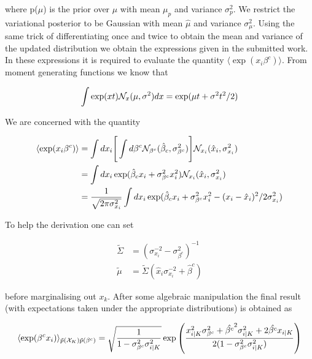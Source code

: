 \documentclass{article}
\begin{document}
\noindent where p($\mu$) is the prior over $\mu$ with mean $\mu_p$ and variance $\sigma^2_p$. We restrict the variational posterior to be Gaussian with mean $\hat{\mu}$ and variance $\sigma^2_\mu$. Using the same trick of differentiating once and twice to obtain the mean and variance of the updated distribution we obtain the expressions given in the submitted work.
In these expressions it is required to evaluate the quantity $\langle \exp(x_i\beta^c)\rangle$. From moment generating functions we know that

\begin{equation*}
\int \exp(xt) \mathcal{N}_{x}(\mu , \sigma^2) dx = \exp(\mu t + \sigma^2t^2/2)
\end{equation*}

We are concerned with the quantity

\begin{equation*}
\begin{split}
\langle \exp(x_i\beta^c)\rangle &= \int dx_i \Bigg[\int d\beta^c \mathcal{N}_{\beta^c}(\hat{\beta}_c, \sigma^2_{\beta^c}) \Bigg] \mathcal{N}_{x_i}(\hat{x}_i,\sigma^2_{x_i}) \\
& = \int dx_i\exp(\hat{\beta}_cx_i + \sigma^2_{\beta^c}x_i^2) \mathcal{N}_{x_i}(\hat{x}_i,\sigma^2_{x_i}) \\
& = \frac{1}{\sqrt{2\pi\sigma^2_{x_i}}}\int dx_i \exp(\hat{\beta}_cx_i + \sigma^2_{\beta^c}x_i^2 - (x_i - \hat{x}_i)^2/2\sigma^2_{x_i})
\end{split}
\end{equation*}

To help the derivation one can set

\begin{equation*}
\begin{split}
\tilde{\Sigma} &= (\sigma^{-2}_{x_i} - \sigma^2_{\beta^c})^{-1} \\
\tilde{\mu} &= \tilde{\Sigma}(\hat{x}_i\sigma^{-2}_{x_i} + \hat{\beta}^c)
\end{split}
\end{equation*}

\noindent before marginalising out $x_k$. After some algebraic manipulation the final result (with expectations taken under the appropriate distributions) is obtained as

\begin{equation*}
\langle \exp(\beta^cx_i)\rangle_{\tilde{p}(\mathcal{X}_K)\tilde{p}(\beta^c)} =
\sqrt{\frac{1}{1 - \sigma^2_{\beta^c}\sigma^2_{i|K}}}\exp\left(\frac{x_{i|K}^2\sigma^2_{\beta^c} + \hat{\beta^c}^2\sigma^2_{i|K} + 2\hat{\beta^c}x_{i|K}}{2(1 - \sigma^2_{\beta^c}\sigma^2_{i|K})} \right)
\end{equation*}
\end{document}
